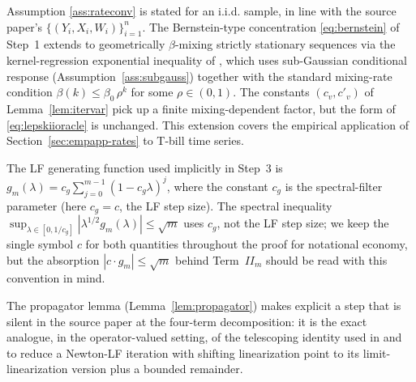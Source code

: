 \begin{remark}\label{rem:mixing}
Assumption \ref{ass:rateconv} is stated for an i.i.d. sample, in line with
the source paper's $\{(Y_i, X_i, W_i)\}_{i=1}^n$. The Bernstein-type
concentration \eqref{eq:bernstein} of Step~1 extends to geometrically
$\beta$-mixing strictly stationary sequences via the kernel-regression
exponential inequality of \citet[Theorem~6]{hansen2008}, which uses
sub-Gaussian conditional response (Assumption~\ref{ass:subgauss}) together
with the standard mixing-rate condition $\beta(k) \le \beta_0\,\rho^k$ for
some $\rho \in (0,1)$. The constants $(c_v, c'_v)$ of
Lemma~\ref{lem:itervar} pick up a finite mixing-dependent factor, but the
form of \eqref{eq:lepskiioracle} is unchanged. This extension covers the
empirical application of Section~\ref{sec:empapp-rates} to T-bill time
series.
\end{remark}

\begin{remark}\label{rem:cg}
The LF generating function used implicitly in Step~3 is
$g_m(\lambda) = c_g\sum_{j=0}^{m-1}(1 - c_g\lambda)^j$, where the constant
$c_g$ is the spectral-filter parameter (here $c_g = c$, the LF step size).
The spectral inequality
$\sup_{\lambda \in [0, 1/c_g]}|\lambda^{1/2} g_m(\lambda)| \le \sqrt m$
\citep[Eq.~6.5]{engl2000} uses $c_g$, not the LF step size; we keep the
single symbol $c$ for both quantities throughout the proof for notational
economy, but the absorption $|c \cdot g_m| \le \sqrt m$ behind
Term~$II_m$ should be read with this convention in mind.
\end{remark}

\begin{remark}\label{rem:propagator-source}
The propagator lemma (Lemma~\ref{lem:propagator}) makes explicit a step that
is silent in the source paper at the four-term decomposition: it is the
exact analogue, in the operator-valued setting, of the telescoping
identity used in \citet[Section~6.2]{engl2000} and
\citet[Proposition~3.4]{bauerhohage2005} to reduce a Newton-LF iteration
with shifting linearization point to its limit-linearization version plus a
bounded remainder.
\end{remark}
